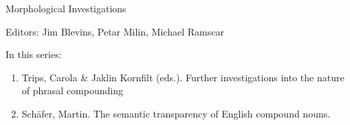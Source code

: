 {\large Morphological Investigations}

\bigskip

Editors: Jim Blevins, Petar Milin, Michael Ramscar  

\bigskip

In this series:

\begin{enumerate}
\item Trips, Carola \& Jaklin Kornfilt (eds.). Further investigations into the nature of phrasal compounding
\item Schäfer, Martin. The semantic transparency of English compound nouns.
\end{enumerate}




